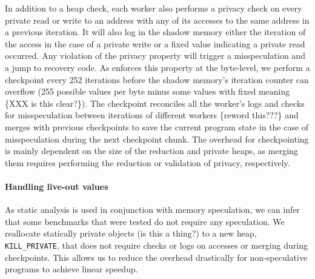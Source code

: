In addition to a heap check, each worker also performs a privacy check on every
private read or write to an
address with any of its accesses to the same address in a previous
iteration. It will also log in the shadow memory either the iteration of the
access in the case of a private write or a fixed value indicating a
private read occurred. Any violation of the privacy property will trigger a
misspeculation and a jump to recovery code. As \name enforces this
property at the byte-level, we perform a checkpoint every 252 iterations
before the shadow memory's iteration counter can overflow (255 possible
values per byte minus some values with fixed meaning \{XXX is this
clear?\}). The checkpoint reconciles all the worker's logs and checks for
misspeculation between iterations of different workers \{reword this???\} and
merges with previous checkpoints to save the current program state in the
case of misspeculation during the next checkpoint chunk. The overhead for
checkpointing is mainly dependent on the size of the reduction and private heaps,
as merging them requires performing the reduction or validation of privacy,
respectively.

\paragraph{Handling live-out values}

As static analysis is used in conjunction with memory speculation, we can
infer that some benchmarks that were tested do not require any speculation.
We reallocate statically private objects (is this a thing?) to a new heap,
\texttt{KILL\_PRIVATE}, that does not require checks or logs on accesses or
merging during checkpoints. This allows us to reduce the overhead
drastically for non-speculative programs to achieve linear speedup.




%
